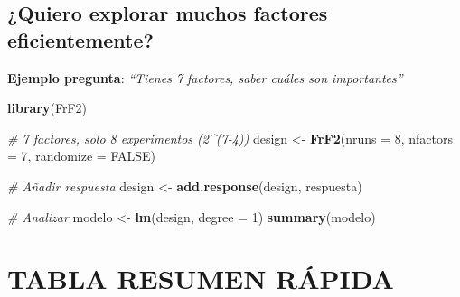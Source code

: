 \documentclass[
  10pt,
]{article}
\newenvironment{Shaded}{\begin{snugshade}}{\end{snugshade}}
\newcommand{\AttributeTok}[1]{\textcolor[rgb]{0.13,0.29,0.53}{#1}}
\newcommand{\CommentTok}[1]{\textcolor[rgb]{0.56,0.35,0.01}{\textit{#1}}}
\newcommand{\ConstantTok}[1]{\textcolor[rgb]{0.56,0.35,0.01}{#1}}
\newcommand{\DecValTok}[1]{\textcolor[rgb]{0.00,0.00,0.81}{#1}}
\newcommand{\FunctionTok}[1]{\textcolor[rgb]{0.13,0.29,0.53}{\textbf{#1}}}
\newcommand{\NormalTok}[1]{#1}
\newcommand{\OtherTok}[1]{\textcolor[rgb]{0.56,0.35,0.01}{#1}}
\begin{document}
\subsection{¿Quiero explorar muchos factores
eficientemente?}\label{quiero-explorar-muchos-factores-eficientemente}

\textbf{Ejemplo pregunta}: \emph{``Tienes 7 factores, saber cuáles son
importantes''}

\begin{Shaded}
\begin{Highlighting}[]
\FunctionTok{library}\NormalTok{(FrF2)}

\CommentTok{\# 7 factores, solo 8 experimentos (2\^{}(7{-}4))}
\NormalTok{design }\OtherTok{\textless{}{-}} \FunctionTok{FrF2}\NormalTok{(}\AttributeTok{nruns =} \DecValTok{8}\NormalTok{, }\AttributeTok{nfactors =} \DecValTok{7}\NormalTok{, }\AttributeTok{randomize =} \ConstantTok{FALSE}\NormalTok{)}

\CommentTok{\# Añadir respuesta}
\NormalTok{design }\OtherTok{\textless{}{-}} \FunctionTok{add.response}\NormalTok{(design, respuesta)}

\CommentTok{\# Analizar}
\NormalTok{modelo }\OtherTok{\textless{}{-}} \FunctionTok{lm}\NormalTok{(design, }\AttributeTok{degree =} \DecValTok{1}\NormalTok{)}
\FunctionTok{summary}\NormalTok{(modelo)}
\end{Highlighting}
\end{Shaded}

\newpage

\section{TABLA RESUMEN RÁPIDA}\label{tabla-resumen-ruxe1pida}
\end{document}
